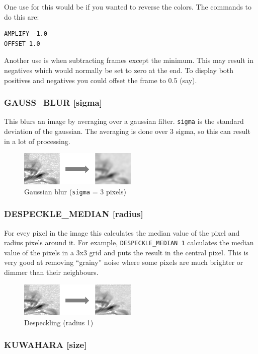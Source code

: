 \documentclass[12pt, a4paper]{article}
\begin{document}
One use for this would be if you wanted to reverse the colors. The commands to do this
are:
\begin{verbatim}
AMPLIFY -1.0
OFFSET 1.0
\end{verbatim}
Another use is when subtracting frames except the minimum. This may result in negatives
which would normally be set to zero at the end. To display both positives and negatives
you could offset the frame to 0.5 (say).

\subsubsection{GAUSS\_BLUR [sigma]}
This blurs an image by averaging over a gaussian filter. \texttt{sigma} is the
standard deviation of the gaussian. The averaging is done over 3 sigma, so this can
result in a lot of processing.

\begin{figure}[ht]
\centering
\includegraphics[width=0.5\textwidth]{gaussblur_eg.png}
\caption{Gaussian blur (\texttt{sigma} = 3 pixels)}
\end{figure}

\subsubsection{DESPECKLE\_MEDIAN [radius]}
For evey pixel in the image this calculates the median value of the pixel and radius pixels
around it. For example, \texttt{DESPECKLE\_MEDIAN 1} calculates the median value of the pixels
in a 3x3 grid and puts the result in the central pixel.
This is very good at removing ``grainy'' noise
where some pixels are much brighter or dimmer than their neighbours.

\begin{figure}[ht]
\centering
\includegraphics[width=0.5\textwidth]{despeckle_eg.png}
\caption{Despeckling (radius 1)}
\end{figure}

\subsubsection{KUWAHARA [size]}
\end{document}
